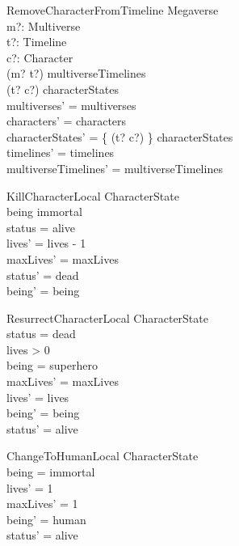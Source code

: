 \documentclass{article}
\begin{document}
\begin{schema}{RemoveCharacterFromTimeline}
\Delta Megaverse \\
m?: Multiverse \\
t?: Timeline \\
c?: Character \\
\where
(m? \mapsto t?) \in multiverseTimelines \\
(t? \mapsto c?) \in \dom characterStates  \\
multiverses' = multiverses \\
characters' = characters \\
characterStates' = \{ (t? \mapsto c?) \} \ndres characterStates \\ 
timelines' = timelines \\
multiverseTimelines' = multiverseTimelines \\
\end{schema}

\begin{schema}{KillCharacterLocal} 
\Delta CharacterState \\
\where
being \neq immortal \\
status = alive \\
lives' = lives - 1 \\
maxLives' = maxLives \\
status' = dead \\
being' = being \\
\end{schema}

\begin{schema}{ResurrectCharacterLocal}
\Delta CharacterState \\
\where
status = dead \\
lives > 0 \\
being = superhero \\
maxLives' = maxLives \\
lives' = lives \\
being' = being \\
status' = alive \\
\end{schema}

\begin{schema}{ChangeToHumanLocal}
\Delta CharacterState \\
\where
being = immortal \\
lives' = 1 \\
maxLives' = 1 \\
being' = human \\
status' = alive \\
\end{schema}
\end{document}
